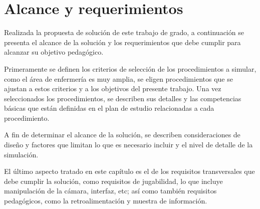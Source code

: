 \chapter{Alcance y requerimientos}
\label{chap:requerimientos}

Realizada la propuesta de solución de este trabajo de grado, a continuación se
presenta el alcance de la solución y los requerimientos que debe cumplir para
alcanzar su objetivo pedagógico.

Primeramente se definen los criterios de selección de los procedimientos a
simular, como el área de enfermería es muy amplia, se eligen procedimientos que
se ajustan a estos criterios y a los objetivos del presente trabajo. Una vez
seleccionados los procedimientos, se describen sus detalles y las competencias
básicas que están definidas en el plan de estudio relacionadas a cada
procedimiento. 

A fin de determinar el alcance de la solución, se describen consideraciones de
diseño y factores que limitan lo que es necesario incluir y el nivel de detalle
de la simulación.

El último aspecto tratado en este capítulo es el de los requisitos transversales
que debe cumplir la solución, como requisitos de jugabilidad, lo que incluye
manipulación de la cámara, interfaz, etc; así como también requisitos
pedagógicos, como la retroalimentación y muestra de información.





